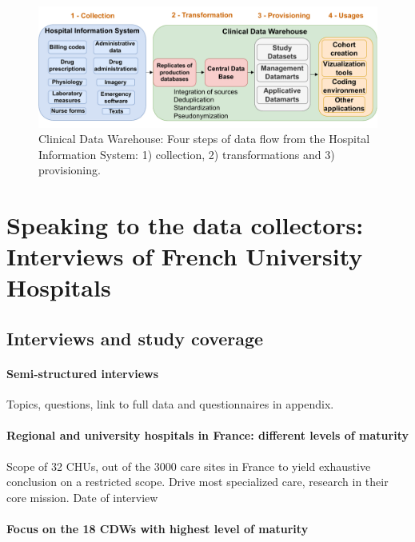\documentclass[french,12pt,twoside,a4paper]{book}
\begin{document}
\begin{figure}
  \centering
  \includegraphics[width=1\linewidth]{img/chapter_2/Fig1.pdf}
  \caption{Clinical Data Warehouse: Four steps of data flow from the Hospital Information System: 1) collection, 2) transformations and 3) provisioning.}
  \label{background:CDW:fig:ehr_flow}
\end{figure}


\section{Speaking to the data collectors: Interviews of French
  University Hospitals}\label{sec:cdw:methods}

\subsection{Interviews and study coverage}\label{subsec:cdw:interviews}

\paragraph{Semi-structured interviews}

Topics, questions, link to full data and questionnaires in appendix.

\paragraph{Regional and university hospitals in France: different levels of maturity}

Scope of 32 CHUs, out of the 3000 care sites in France to yield exhaustive
conclusion on a restricted scope. Drive most specialized care, research in their
core mission. Date of interview

\paragraph{Focus on the 18 CDWs with highest level of maturity}
\end{document}

